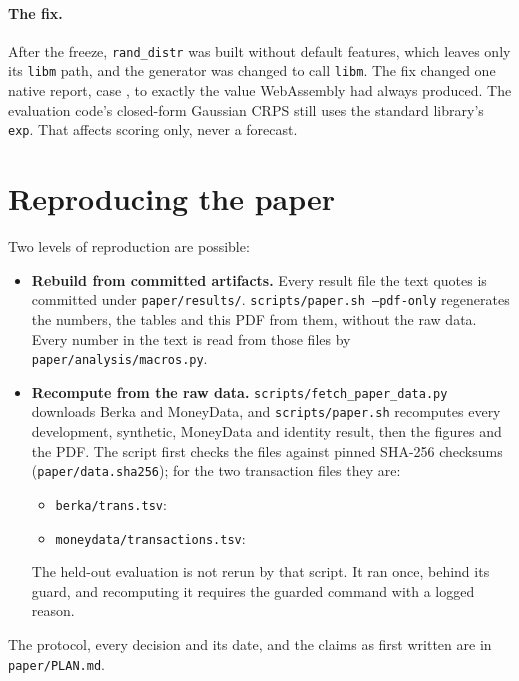 \paragraph{The fix.} After the freeze, \texttt{rand\_distr} was built
without default features, which leaves only its \texttt{libm} path, and the
generator was changed to call \texttt{libm}. The fix changed one native
report, case , to exactly the value WebAssembly had always
produced. The evaluation code's closed-form Gaussian CRPS still uses the
standard library's \texttt{exp}. That affects scoring only, never a
forecast.

\section{Reproducing the paper}
\sloppy
Two levels of reproduction are possible:
\begin{itemize}
\item \textbf{Rebuild from committed artifacts.} Every result file the text
  quotes is committed under \texttt{paper/results/}.
  \texttt{scripts/paper.sh --pdf-only} regenerates the numbers, the tables
  and this PDF from them, without the raw data. Every number in the text
  is read from those files by \texttt{paper/analysis/macros.py}.
\item \textbf{Recompute from the raw data.}
  \texttt{scripts/fetch\_paper\_data.py} downloads Berka and MoneyData, and
  \texttt{scripts/paper.sh} recomputes every development, synthetic,
  MoneyData and identity result, then the figures and the PDF. The script
  first checks the files against pinned SHA-256 checksums
  (\texttt{paper/data.sha256}); for the two transaction files they are:
  \begin{itemize}
  \item \texttt{berka/trans.tsv}:\\
    \texttt{\scriptsize{}}
  \item \texttt{moneydata/transactions.tsv}:\\
    \texttt{\scriptsize{}}
  \end{itemize}
  The held-out evaluation is not rerun by that script. It ran once,
  behind its guard, and recomputing it requires the guarded command with
  a logged reason.
\end{itemize}
The protocol, every decision and its date, and the claims as first written
are in \texttt{paper/PLAN.md}.
